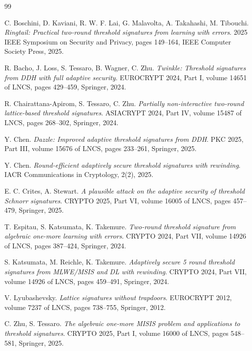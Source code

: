 \documentclass{aicr-conjecture}
\begin{document}
\begin{aicrbibliography}{99}

C. Boschini, D. Kaviani, R. W. F. Lai, G. Malavolta, A. Takahashi,
M. Tibouchi.
\emph{Ringtail: Practical two-round threshold signatures from learning
with errors}.
2025 IEEE Symposium on Security and Privacy, pages 149--164, IEEE
Computer Society Press, 2025.

R. Bacho, J. Loss, S. Tessaro, B. Wagner, C. Zhu.
\emph{Twinkle: Threshold signatures from DDH with full adaptive
security}.
EUROCRYPT 2024, Part I, volume 14651 of LNCS, pages 429--459, Springer,
2024.

R. Chairattana-Apirom, S. Tessaro, C. Zhu.
\emph{Partially non-interactive two-round lattice-based threshold
signatures}.
ASIACRYPT 2024, Part IV, volume 15487 of LNCS, pages 268--302,
Springer, 2024.

Y. Chen.
\emph{Dazzle: Improved adaptive threshold signatures from DDH}.
PKC 2025, Part III, volume 15676 of LNCS, pages 233--261, Springer,
2025.

Y. Chen.
\emph{Round-efficient adaptively secure threshold signatures with
rewinding}.
IACR Communications in Cryptology, 2(2), 2025.

E. C. Crites, A. Stewart.
\emph{A plausible attack on the adaptive security of threshold Schnorr
signatures}.
CRYPTO 2025, Part VI, volume 16005 of LNCS, pages 457--479, Springer,
2025.

T. Espitau, S. Katsumata, K. Takemure.
\emph{Two-round threshold signature from algebraic one-more learning
with errors}.
CRYPTO 2024, Part VII, volume 14926 of LNCS, pages 387--424, Springer,
2024.

S. Katsumata, M. Reichle, K. Takemure.
\emph{Adaptively secure 5 round threshold signatures from MLWE/MSIS and
DL with rewinding}.
CRYPTO 2024, Part VII, volume 14926 of LNCS, pages 459--491, Springer,
2024.

V. Lyubashevsky.
\emph{Lattice signatures without trapdoors}.
EUROCRYPT 2012, volume 7237 of LNCS, pages 738--755, Springer, 2012.

C. Zhu, S. Tessaro.
\emph{The algebraic one-more MISIS problem and applications to
threshold signatures}.
CRYPTO 2025, Part I, volume 16000 of LNCS, pages 548--581, Springer,
2025.

\end{aicrbibliography}
\end{document}
